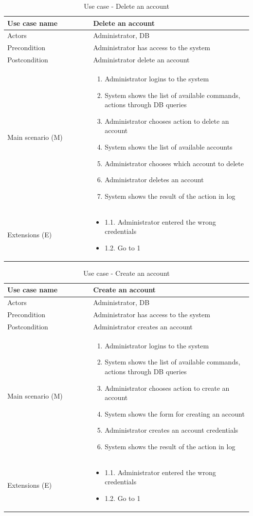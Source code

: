 \documentclass[12pt]{article}
\newcommand\tabularhead[1]{
\begin{table}[h]
  \caption{Use case - #1}
  \begin{tabular}{|p{0.35\linewidth}|p{0.65\linewidth}|}
    \hline
    \textbf{Use case name} & \textbf{#1} \\
    \hline}
\newcommand\addrow[2]{#1 &#2\\ \hline}
\newcommand\adddoublerow[2]{\begin{minipage}[t][][t]{2.5cm}#1\end{minipage}%
    &\begin{minipage}[t][][t]{\linewidth}
     \begin{itemize}\setlength{\itemsep}{0pt}%
        #2     
     \end{itemize}
     \end{minipage}\\ \hline}
\newcommand\addmulrow[2]{ \begin{minipage}[t][][t]{2.5cm}#1\end{minipage}%
     &\begin{minipage}[t][][t]{\linewidth}
      \begin{enumerate}\setlength{\itemsep}{0pt}%
        #2   
      \end{enumerate}
      \end{minipage}\\ \hline}
\newenvironment{usecase}{\tabularhead}
{\hline\end{tabular}\end{table}}
\begin{document}
\begin{usecase}{Delete an account}
    \addrow{Actors}{Administrator, DB}
    \addrow{Precondition}{Administrator has access to the system}
    \addrow{Postcondition}{Administrator delete an account}
    \addmulrow{Main scenario (M)}{
        \item Administrator logins to the system
        \item System shows the list of available commands, actions through DB queries
        \item Administrator chooses action to delete an account
        \item System shows the list of available accounts
        \item Administrator chooses which account to delete
        \item Administrator deletes an account
        \item System shows the result of the action in log
    }
    \adddoublerow{Extensions (E)}{
        \item[] 1.1. Administrator entered the wrong credentials
        \item[] 1.2. Go to 1
    }
\end{usecase}
\newpage
\begin{usecase}{Create an account}
    \addrow{Actors}{Administrator, DB}
    \addrow{Precondition}{Administrator has access to the system}
    \addrow{Postcondition}{Administrator creates an account}
    \addmulrow{Main scenario (M)}{
        \item Administrator logins to the system
        \item System shows the list of available commands, actions through DB queries
        \item Administrator chooses action to create an account
        \item System shows the form for creating an account
        \item Administrator creates an account credentials
        \item System shows the result of the action in log
    }
    \adddoublerow{Extensions (E)}{
        \item[] 1.1. Administrator entered the wrong credentials
        \item[] 1.2. Go to 1
    }
\end{usecase}
\end{document}
